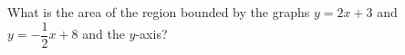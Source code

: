 What is the area of the region bounded by the graphs $y = 2x+3$ and $y = -\dfrac{1}{2}x + 8$ and the $y$-axis?
